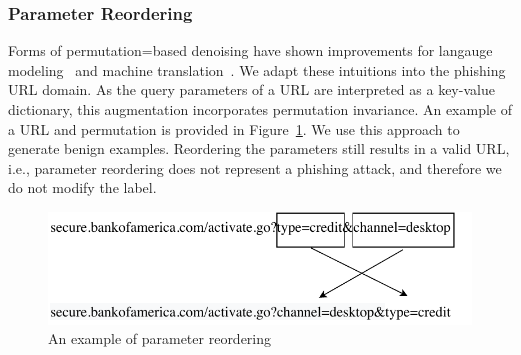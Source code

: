 \subsubsection{Parameter Reordering}
Forms of permutation=based denoising have shown improvements for langauge modeling~\cite{lewis2020bart} and machine translation~\cite{lample2018unsupervised}.
We adapt these intuitions into the phishing URL domain.
As the query parameters of a URL are interpreted as a key-value dictionary, this augmentation incorporates permutation invariance. 
An example of a URL and permutation is provided in Figure~\ref{fig:urltran:permute_url}.
We use this approach to generate benign examples.
Reordering the parameters still results in a valid URL, i.e., parameter reordering does not represent a phishing attack, and therefore we do not modify the label.
\begin{figure}
	\centering
	\includegraphics[width=0.75\linewidth]{urltran/figures/PermuteURL}
	\caption{An example of parameter reordering}
	\label{fig:urltran:permute_url}
\end{figure} 


 

